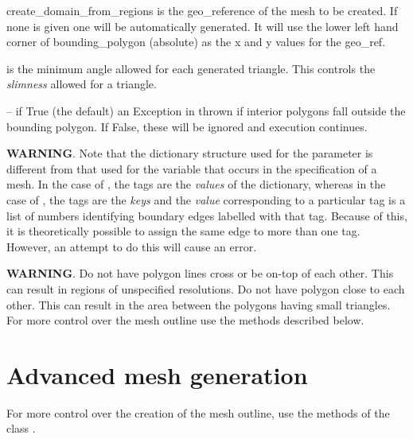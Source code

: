 \documentclass{manual}
\begin{document}
\begin{funcdesc}{create_domain_from_regions}
 is the geo_reference of the mesh to be created.
If none is given one will be automatically generated.  It will use
the lower left hand corner of  bounding_polygon (absolute)
as the x and y values for the geo_ref.

 is the minimum angle allowed for each generated triangle.
This controls the \emph{slimness} allowed for a triangle.

 -- if True (the default) an Exception in thrown
if interior polygons fall outside the bounding polygon. If False, these
will be ignored and execution continues.

\textbf{WARNING}. Note that the dictionary structure used for the
parameter  is different from that used for the
variable  that occurs in the specification of a mesh.
In the case of , the tags are the \emph{values} of
the dictionary, whereas in the case of , the
tags are the \emph{keys} and the \emph{value} corresponding to a
particular tag is a list of numbers identifying boundary edges
labelled with that tag. Because of this, it is theoretically
possible to assign the same edge to more than one tag. However, an
attempt to do this will cause an error.

\textbf{WARNING}. Do not have polygon lines cross or be on-top of each
    other. This can result in regions of unspecified resolutions. Do
    not have polygon close to each other. This can result in the area
    between the polygons having small triangles.  For more control
    over the mesh outline use the methods described below.

\end{funcdesc}

\section{Advanced mesh generation}

For more control over the creation of the mesh outline, use the
methods of the class .
\end{document}
